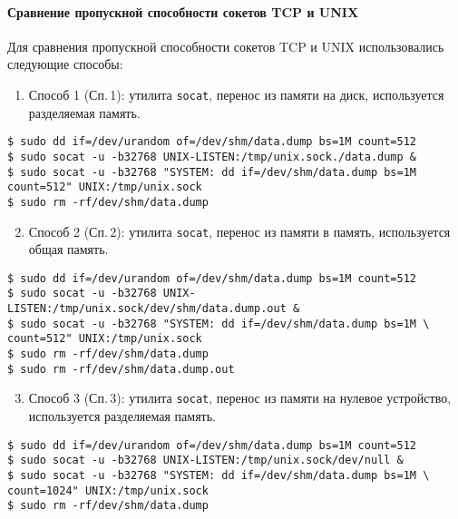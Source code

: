 \paragraph{Сравнение пропускной способности сокетов TCP и UNIX}

Для сравнения пропускной способности сокетов TCP и UNIX использовались следующие способы:

\begin{enumerate}
\setcounter{enumi}{0}
\item Способ 1 (Сп.\,1): утилита \texttt{socat}, перенос из памяти на диск, используется разделяемая память.
\end{enumerate}

\noindent
\begin{lstlisting}
$ sudo dd if=/dev/urandom of=/dev/shm/data.dump bs=1M count=512
$ sudo socat -u -b32768 UNIX-LISTEN:/tmp/unix.sock./data.dump &
$ sudo socat -u -b32768 "SYSTEM: dd if=/dev/shm/data.dump bs=1M count=512" UNIX:/tmp/unix.sock
$ sudo rm -rf/dev/shm/data.dump
\end{lstlisting}

\begin{enumerate}
\setcounter{enumi}{1}
\item Способ 2 (Сп.\,2): утилита \texttt{socat}, перенос из памяти в память, используется общая память.
\end{enumerate}

\noindent
\begin{lstlisting}
$ sudo dd if=/dev/urandom of=/dev/shm/data.dump bs=1M count=512
$ sudo socat -u -b32768 UNIX-LISTEN:/tmp/unix.sock/dev/shm/data.dump.out &
$ sudo socat -u -b32768 "SYSTEM: dd if=/dev/shm/data.dump bs=1M \
count=512" UNIX:/tmp/unix.sock
$ sudo rm -rf/dev/shm/data.dump
$ sudo rm -rf/dev/shm/data.dump.out
\end{lstlisting}

\begin{enumerate}
\setcounter{enumi}{2}
\item  Способ 3 (Сп.\,3): утилита \texttt{socat}, перенос из памяти на нулевое устройство, используется разделяемая память.
\end{enumerate}

\noindent
\begin{lstlisting}
$ sudo dd if=/dev/urandom of=/dev/shm/data.dump bs=1M count=512
$ sudo socat -u -b32768 UNIX-LISTEN:/tmp/unix.sock/dev/null &
$ sudo socat -u -b32768 "SYSTEM: dd if=/dev/shm/data.dump bs=1M \
count=1024" UNIX:/tmp/unix.sock
$ sudo rm -rf/dev/shm/data.dump
\end{lstlisting}

